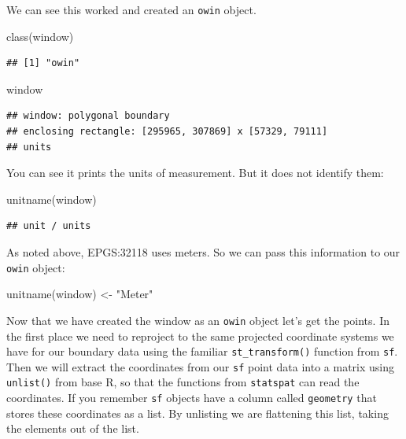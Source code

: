 \documentclass[
  krantz2]{krantz}
\makeatletter
\newenvironment{Shaded}{\begin{snugshade}}{\end{snugshade}}
\newcommand{\FunctionTok}[1]{\textcolor[rgb]{0,0,0}{#1}}
\newcommand{\NormalTok}[1]{#1}
\newcommand{\OtherTok}[1]{\textcolor[rgb]{0.37,0.37,0.37}{#1}}
\newcommand{\StringTok}[1]{\textcolor[rgb]{0.5,0.5,0.5}{#1}}
\newenvironment{kframe}{%
\medskip{}
\setlength{\fboxsep}{.8em}
 \def\at@end@of@kframe{}%
 \ifinner\ifhmode%
  \def\at@end@of@kframe{\end{minipage}}%
  \begin{minipage}{\columnwidth}%
 \fi\fi%
 \def\FrameCommand##1{\hskip\@totalleftmargin \hskip-\fboxsep
 \colorbox{shadecolor}{##1}\hskip-\fboxsep
     \hskip-\linewidth \hskip-\@totalleftmargin \hskip\columnwidth}%
 \MakeFramed {\advance\hsize-\width
   \@totalleftmargin\z@ \linewidth\hsize
   \@setminipage}}%
 {\par\unskip\endMakeFramed%
 \at@end@of@kframe}
\renewenvironment{Shaded}{\begin{kframe}}{\end{kframe}}
\makeatother
\begin{document}
We can see this worked and created an \texttt{owin} object.

\begin{Shaded}
\begin{Highlighting}[]
\FunctionTok{class}\NormalTok{(window)}
\end{Highlighting}
\end{Shaded}

\begin{verbatim}
## [1] "owin"
\end{verbatim}

\begin{Shaded}
\begin{Highlighting}[]
\NormalTok{window}
\end{Highlighting}
\end{Shaded}

\begin{verbatim}
## window: polygonal boundary
## enclosing rectangle: [295965, 307869] x [57329, 79111] 
## units
\end{verbatim}

You can see it prints the units of measurement. But it does not identify them:

\begin{Shaded}
\begin{Highlighting}[]
\FunctionTok{unitname}\NormalTok{(window)}
\end{Highlighting}
\end{Shaded}

\begin{verbatim}
## unit / units
\end{verbatim}

As noted above, EPGS:32118 uses meters. So we can pass this information to our \texttt{owin} object:

\begin{Shaded}
\begin{Highlighting}[]
\FunctionTok{unitname}\NormalTok{(window) }\OtherTok{\textless{}{-}} \StringTok{"Meter"}
\end{Highlighting}
\end{Shaded}

Now that we have created the window as an \texttt{owin} object let's get the points. In the first place we need to reproject to the same projected coordinate systems we have for our boundary data using the familiar \texttt{st\_transform()} function from \texttt{sf}. Then we will extract the coordinates from our \texttt{sf} point data into a matrix using \texttt{unlist()} from base R, so that the functions from \texttt{statspat} can read the coordinates. If you remember \texttt{sf} objects have a column called \texttt{geometry} that stores these coordinates as a list. By unlisting we are flattening this list, taking the elements out of the list.
\end{document}
